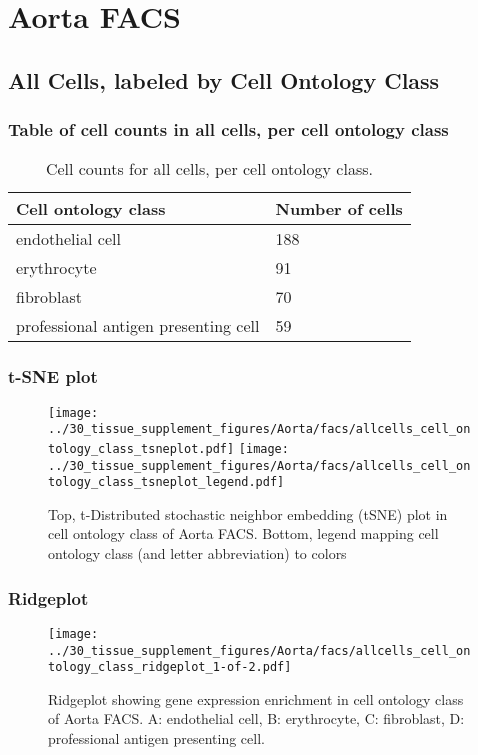 \newpage
\section{Aorta FACS}

\subsection{All Cells, labeled by Cell Ontology Class}
\subsubsection{Table of cell counts in all cells, per cell ontology class}\begin{table}[h]
\centering
\label{my-label}
\begin{tabular}{@{}ll@{}}
\toprule

Cell ontology class& Number of cells \\ \midrule
endothelial cell & 188 \\

erythrocyte & 91 \\

fibroblast & 70 \\

professional antigen presenting cell & 59 \\
\bottomrule
\end{tabular}
\caption{Cell counts for all cells, per cell ontology class.}
\end{table}

\newpage
\subsubsection{t-SNE plot}
\begin{figure}[h]
\centering
\texttt{[image: ../30\_tissue\_supplement\_figures/Aorta/facs/allcells\_cell\_ontology\_class\_tsneplot.pdf]}
\texttt{[image: ../30\_tissue\_supplement\_figures/Aorta/facs/allcells\_cell\_ontology\_class\_tsneplot\_legend.pdf]}
\caption{Top, t-Distributed stochastic neighbor embedding (tSNE) plot  in cell ontology class of Aorta FACS. Bottom, legend mapping cell ontology class (and letter abbreviation) to colors}
\end{figure}


\newpage
\newpage
\subsubsection{Ridgeplot}
\begin{figure}[h]
\centering
\texttt{[image: ../30\_tissue\_supplement\_figures/Aorta/facs/allcells\_cell\_ontology\_class\_ridgeplot\_1-of-2.pdf]}

\caption{ Ridgeplot  showing gene expression enrichment in cell ontology class of Aorta FACS. A: endothelial cell, B: erythrocyte, C: fibroblast, D: professional antigen presenting cell.}
\end{figure}


